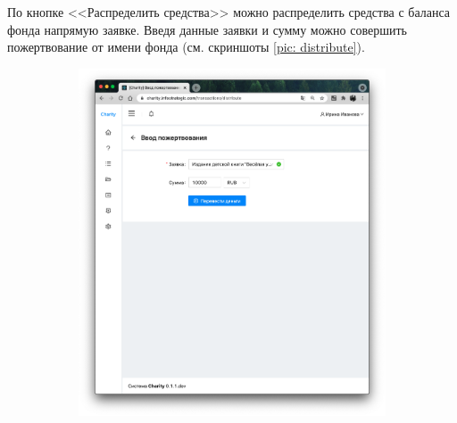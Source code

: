 \documentclass[a4paper,12pt,reqno]{article}
\begin{document}
	По кнопке <<Распределить средства>> можно распределить средства с баланса фонда напрямую заявке. Введя данные заявки и сумму можно совершить пожертвование от имени фонда (см. скриншоты \ref{pic: distribute}). 
	
		\begin{figure}[H]
	    \centering
		\begin{subfigure}[b]{0.475\linewidth}
			\includegraphics[width=\linewidth]{img/ro/donation_distribute_form.png}
		\end{subfigure}
		\begin{subfigure}[b]{0.475\linewidth}

\end{subfigure}
\end{figure}
\end{document}
